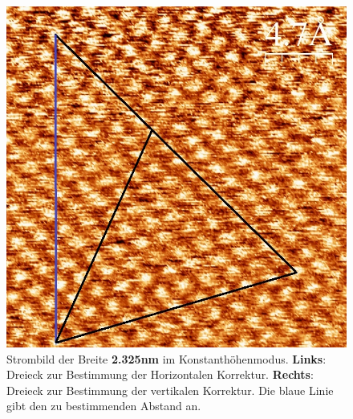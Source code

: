 \documentclass[12pt,a4paper]{article}
\begin{document}
\begin{figure}[H]
\includegraphics[scale=0.36]{Bilder/Atome/hoch2_v.jpg}
\caption{Strombild der Breite \textbf{2.325nm} im Konstanthöhenmodus. \textbf{Links}: Dreieck zur Bestimmung der Horizontalen Korrektur. \textbf{Rechts}: Dreieck zur Bestimmung der vertikalen Korrektur. Die blaue Linie gibt den zu bestimmenden Abstand an.}
\end{figure}
\end{document}
